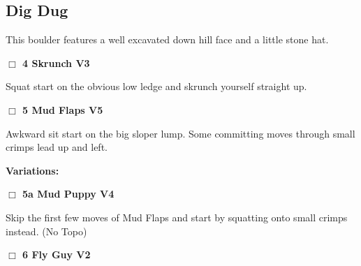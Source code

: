 	\begin{multicols}{2}

\needspace{10em}
\subsection*{Dig Dug}\label{bf:Dig Dug}

This boulder features a well excavated down hill face and a little stone hat.\\



\needspace{2em}
\label{rt:Skrunch}
\colorbox{green!20}{
\parbox{0.95\linewidth}{
\hspace{-1ex}\textbf{$\Box$
4 Skrunch V3  
}}}
\begin{adjustwidth}{1.3em}{}			

Squat start on the obvious low ledge and skrunch yourself straight up.
\end{adjustwidth}




\needspace{2em}
\label{rt:Mud Flaps}
\colorbox{RoyalBlue!20}{
\parbox{0.95\linewidth}{
\hspace{-1ex}\textbf{$\Box$
5 Mud Flaps V5  
}}}
\begin{adjustwidth}{1.3em}{}			

Awkward sit start on the big sloper lump. Some committing moves through small crimps lead up and left.
\end{adjustwidth}


\begin{adjustwidth}{0.5cm}{}				
\needspace{4em}
\textbf{Variations:} \newline

\needspace{2em}
\label{vr:Mud Puppy}
\colorbox{RoyalBlue!20}{
\parbox{0.95\linewidth}{
\hspace{-1ex}\textbf{$\Box$
5a Mud Puppy V4  
}}}
\begin{adjustwidth}{1.3em}{}			

Skip the first few moves of Mud Flaps and start by squatting onto small crimps instead.
  (No Topo)
\end{adjustwidth}



\end{adjustwidth}


\needspace{2em}
\label{rt:Fly Guy}
\colorbox{green!20}{
\parbox{0.95\linewidth}{
\hspace{-1ex}\textbf{$\Box$
6 Fly Guy V2  
}}}
\begin{adjustwidth}{1.3em}{}			


\end{adjustwidth}
\end{multicols}
